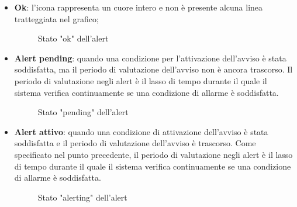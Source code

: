 \begin{itemize}
    \item \textbf{Ok}: l'icona rappresenta un cuore intero e non è presente alcuna linea tratteggiata nel grafico; 
    \begin{figure}[H]
        \centering
        \caption{Stato "ok" dell'alert}
        \label{fig:my_label}
    \end{figure}
    \item \textbf{Alert pending}: 
    quando una condizione per l'attivazione dell'avviso è stata soddisfatta, ma il periodo di valutazione dell'avviso non è ancora trascorso. Il periodo di valutazione negli alert è il lasso di tempo durante il quale il sistema verifica continuamente se una condizione di allarme è soddisfatta.  
    \begin{figure}[H]
        \centering
        \caption{Stato "pending" dell'alert}
        \label{fig:my_label}
    \end{figure}
    \item \textbf{Alert attivo}: quando una condizione di attivazione dell'avviso è stata soddisfatta e il periodo di valutazione dell'avviso è trascorso. Come specificato nel punto precedente, il periodo di valutazione negli alert è il lasso di tempo durante il quale il sistema verifica continuamente se una condizione di allarme è soddisfatta.   
    \begin{figure}[H]
        \centering
        \caption{Stato "alerting" dell'alert}
        \label{fig:my_label}
    \end{figure}
\end{itemize}

